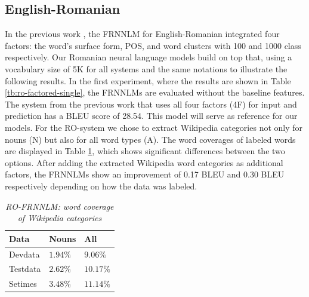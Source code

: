 \documentclass[a4paper]{article}
\begin{document}
\subsection{English-Romanian}
In the previous work \cite{niehuesusing}, the FRNNLM for English-Romanian integrated four factors: the word's surface form, POS, and word clusters with 100 and 1000 class respectively. Our Romanian neural language models build on top that, using a vocabulary size of 5K for all systems and the same notations to illustrate the following results. In the first experiment, where the results are shown in Table \ref{tb:ro-factored-single}, the FRNNLMs are evaluated without the baseline features. The system from the previous work that uses all four factors (4F) for input and prediction has a BLEU score of 28.54. This model will serve as reference for our models. For the RO-system we chose to extract Wikipedia categories not only for nouns (N) but also for all word types (A). The word coverages of labeled words are displayed in Table \ref{tb:ro-word-coverage}, which shows significant differences between the two options.
After adding the extracted Wikipedia word categories as additional factors, the FRNNLMs show an improvement of 0.17 BLEU and 0.30 BLEU respectively depending on how the data was labeled.

\begin{table}
\caption{\it RO-FRNNLM: word coverage of Wikipedia categories}
\vspace{2mm}
\centering
  \begin{tabular}{lll}
  	\hline
  	Data     & Nouns     & All        \\ \hline\hline
  	Devdata  & $1.94 \%$ & $9.06 \%$  \\
  	Testdata & $2.62 \%$ & $10.17 \%$ \\ \hline
  	Setimes  & $3.48 \%$ & $11.14 \%$
  \end{tabular}
  \label{tb:ro-word-coverage}
\end{table}

\end{document}
